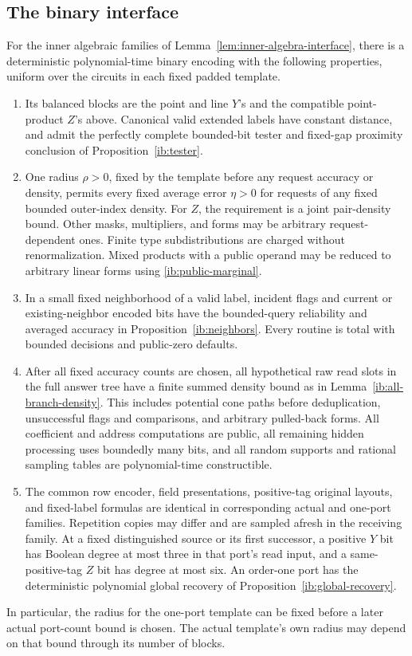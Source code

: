 \subsection{The binary interface}

\begin{lemma}
\label{lem:inner-binary-interface}
For the inner algebraic families of
Lemma~\ref{lem:inner-algebra-interface}, there is a deterministic
polynomial-time binary encoding with the following properties,
uniform over the circuits in each fixed padded template.
\begin{enumerate}[label=(\roman*)]
\item Its balanced blocks are the point and line \(Y\)'s and the
compatible point-product \(Z\)'s above.  Canonical valid extended
labels have constant distance, and admit the perfectly complete
bounded-bit tester and fixed-gap proximity conclusion of
Proposition~\ref{ib:tester}.
\item One radius \(\rho>0\), fixed by the template before any
request accuracy or density, permits every fixed average error
\(\eta>0\) for requests of any fixed bounded outer-index density.
For \(Z\), the requirement is a joint pair-density bound.  Other
masks, multipliers, and forms may be arbitrary request-dependent
ones.  Finite type subdistributions are charged without
renormalization.  Mixed products with a public operand may be
reduced to arbitrary linear forms using
\eqref{ib:public-marginal}.
\item In a small fixed neighborhood of a valid label, incident
flags and current or existing-neighbor encoded bits have the
bounded-query reliability and averaged accuracy in
Proposition~\ref{ib:neighbors}.  Every routine is total with
bounded decisions and public-zero defaults.
\item After all fixed accuracy counts are chosen, all hypothetical
raw read slots in the full answer tree have a finite summed
density bound as in Lemma~\ref{ib:all-branch-density}.  This
includes potential cone paths before deduplication, unsuccessful
flags and comparisons, and arbitrary pulled-back forms.  All
coefficient and address computations are public, all remaining
hidden processing uses boundedly many bits, and all random
supports and rational sampling tables are polynomial-time
constructible.
\item The common row encoder, field presentations, positive-tag
original layouts, and fixed-label formulas are identical in
corresponding actual and one-port families.  Repetition copies
may differ and are sampled afresh in the receiving family.
At a fixed distinguished source or its first successor, a
positive \(Y\) bit has Boolean degree at most three in that
port's read input, and a same-positive-tag \(Z\) bit has degree
at most six.  An order-one port has the deterministic polynomial
global recovery of Proposition~\ref{ib:global-recovery}.
\end{enumerate}
In particular, the radius for the one-port template can be fixed
before a later actual port-count bound is chosen.  The actual
template's own radius may depend on that bound through its number
of blocks.
\end{lemma}


